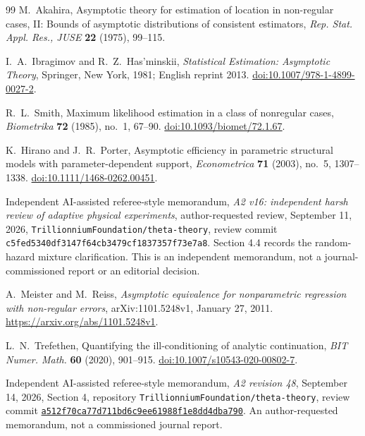 \begin{thebibliography}{99}
M.~Akahira, Asymptotic theory for estimation of location in non-regular
cases, II: Bounds of asymptotic distributions of consistent estimators,
\emph{Rep. Stat. Appl. Res., JUSE} \textbf{22} (1975), 99--115.

I.~A.~Ibragimov and R.~Z.~Has'minskii,
\emph{Statistical Estimation: Asymptotic Theory},
Springer, New York, 1981; English reprint 2013.
\href{https://doi.org/10.1007/978-1-4899-0027-2}{doi:10.1007/978-1-4899-0027-2}.

R.~L.~Smith, Maximum likelihood estimation in a class of nonregular
cases, \emph{Biometrika} \textbf{72} (1985), no.~1, 67--90.
\href{https://doi.org/10.1093/biomet/72.1.67}{doi:10.1093/biomet/72.1.67}.

K.~Hirano and J.~R.~Porter,
Asymptotic efficiency in parametric structural models with
parameter-dependent support, \emph{Econometrica} \textbf{71} (2003),
no.~5, 1307--1338.
\href{https://doi.org/10.1111/1468-0262.00451}{doi:10.1111/1468-0262.00451}.

Independent AI-assisted referee-style memorandum,
\emph{A2 v16: independent harsh review of adaptive physical experiments},
author-requested review, September 11, 2026,
\texttt{Trillionnium\allowbreak Foundation/\allowbreak theta-theory},
review commit \texttt{c5fed534\allowbreak 0df3147f\allowbreak 64cb3479\allowbreak cf183735\allowbreak 7f73e7a8}.
Section 4.4 records the random-hazard mixture clarification.
This is an independent memorandum, not a journal-commissioned report
or an editorial decision.

A.~Meister and M.~Reiss, \emph{Asymptotic equivalence for nonparametric
regression with non-regular errors}, arXiv:1101.5248v1, January 27, 2011.
\url{https://arxiv.org/abs/1101.5248v1}.

L.~N.~Trefethen, Quantifying the ill-conditioning of analytic continuation,
\emph{BIT Numer. Math.} \textbf{60} (2020), 901--915.
\href{https://doi.org/10.1007/s10543-020-00802-7}{doi:10.1007/s10543-020-00802-7}.


Independent AI-assisted referee-style memorandum,
\emph{A2 revision 48}, September 14, 2026, Section 4,
repository \texttt{Trillionnium\allowbreak Foundation/\allowbreak theta-theory},
review commit
\href{https://github.com/TrillionniumFoundation/theta-theory/commit/a512f70ca77d711bd6c9ee61988f1e8dd4dba790}{\texttt{a512f70c\allowbreak a77d711b\allowbreak d6c9ee61\allowbreak 988f1e8d\allowbreak d4dba790}}.
An author-requested memorandum, not a commissioned journal report.

\end{thebibliography}
